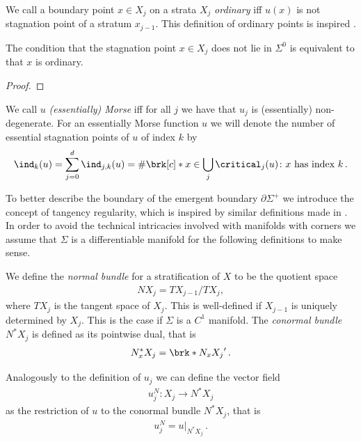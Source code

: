 We call a boundary point $x\in X_j$ on a strata $X_j$ \emph{ordinary} iff $u(x)$ is not 
stagnation point of a stratum $x_{j-1}$. This definition of ordinary points is inspired \cite{Morse1970}.
\begin{proposition}
  The condition that the stagnation point $x\in X_j$ does not lie in $\Sigma^0$ is equivalent to that
  $x$ is ordinary.
\end{proposition}
\begin{proof}
\end{proof}

\begin{definition}
  We call $u$ \emph{(essentially) Morse} iff for all $j$ we have that $u_j$ is (essentially) non-degenerate.
  For an essentially Morse function $u$ we will denote the number of
  essential stagnation points of $u$ of index $k$ by
  \begin{align*}
    \ind_k(u)=\sum_{j=0}^d\ind_{j,k}(u)=\#\brk[c]*{x\in\bigcup_j\critical_j(u)\colon x\text{ has index }k}\,.
  \end{align*}
\end{definition}

To better describe the boundary of the emergent boundary $\partial\Sigma^+$ we introduce the
concept of tangency regularity, which is inspired by similar definitions made in \cite{Katz2014}.
In order to avoid the technical intricacies involved with manifolds with corners we assume that
$\Sigma$ is a differentiable manifold for the following definitions to make sense.
\begin{definition}
  We define the \emph{normal bundle} for a stratification of $X$ to be the quotient space
  \begin{align}
    NX_j=TX_{j-1}/TX_j,
  \end{align}
  where $TX_j$ is the tangent space of $X_j$. This is well-defined if $X_{j-1}$ is uniquely determined
  by $X_j$. This is the case if $\Sigma$ is a $C^1$ manifold.
  The \emph{conormal bundle} $N^*X_j$ is defined as its pointwise dual, that is
  \begin{align*}
    N_x^*X_j=\brk*{N_xX_j}'\,.
  \end{align*}
\end{definition}

Analogously to the definition of $u_j$ we can define the vector field
\begin{align*}
  u_j^N\colon X_j\to N^*X_j
\end{align*}
as the restriction of $u$ to the conormal bundle $N^*X_j$, that is
\begin{align}
  u_j^N=u\big\vert_{N^*X_j}\,.\label{eq:def_projectionUNStratification}
\end{align}

